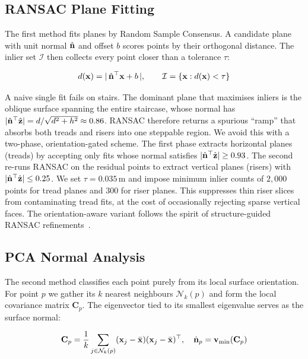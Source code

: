 \subsection{RANSAC Plane Fitting}
The first method fits planes by Random Sample Consensus. A candidate plane with
unit normal $\hat{\mathbf{n}}$ and offset $b$ scores points by their orthogonal distance.
The inlier set $\mathcal{I}$ then collects every point closer than a tolerance
$\tau$:

\begin{equation}\label{eq:plane}
d(\mathbf{x}) = |\,\hat{\mathbf{n}}^\top \mathbf{x} + b\,|,\qquad
\mathcal{I} = \{\mathbf{x} : d(\mathbf{x}) < \tau\}
\end{equation}

A naive single fit fails on stairs. The dominant plane that maximises inliers is
the oblique surface spanning the entire staircase, whose normal has
$|\hat{\mathbf{n}}^\top\hat{\mathbf{z}}| = d/\sqrt{d^2+h^2}\approx 0.86$. RANSAC therefore returns a
spurious ``ramp'' that absorbs both treads and risers into one steppable region.
We avoid this with a two-phase, orientation-gated scheme. The first phase
extracts horizontal planes (treads) by accepting only fits whose normal
satisfies $|\hat{\mathbf{n}}^\top\hat{\mathbf{z}}|\ge 0.93$. The second re-runs RANSAC on the residual
points to extract vertical planes (risers) with $|\hat{\mathbf{n}}^\top\hat{\mathbf{z}}|\le 0.25$. We
set $\tau=0.035$\,m and impose minimum inlier counts of $2{,}000$ points for
tread planes and $300$ for riser planes. This suppresses thin riser slices from
contaminating tread fits, at the cost of occasionally rejecting sparse vertical
faces. The orientation-aware variant follows the spirit of structure-guided
RANSAC refinements~\cite{li2017improved,jalal2021rgb}.

\subsection{PCA Normal Analysis}
The second method classifies each point purely from its local surface
orientation. For point $p$ we gather its $k$ nearest neighbours
$\mathcal{N}_k(p)$ and form the local covariance matrix $\mathbf{C}_p$. The
eigenvector tied to its smallest eigenvalue serves as the surface normal:

\begin{equation}\label{eq:cov}
\mathbf{C}_p = \frac{1}{k}\sum_{j\in\mathcal{N}_k(p)}
(\mathbf{x}_j-\bar{\mathbf{x}})(\mathbf{x}_j-\bar{\mathbf{x}})^\top,\quad
\hat{\mathbf{n}}_p = \mathbf{v}_{\min}(\mathbf{C}_p)
\end{equation}

